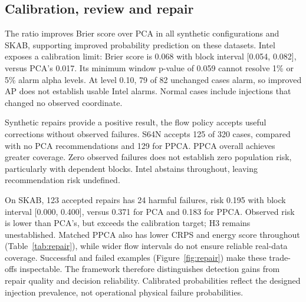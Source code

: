 \documentclass{llncs}
\newcommand{\1}{\mathbf{1}}
\begin{document}
\subsection{Calibration, review and repair}
The ratio improves Brier score over PCA in all synthetic configurations and SKAB, supporting improved probability prediction on these datasets. Intel exposes a calibration limit: Brier score is 0.068 with block interval [0.054, 0.082], versus PCA's 0.017. Its minimum window p-value of 0.059 cannot resolve 1\% or 5\% alarm alpha levels. At level 0.10, 79 of 82 unchanged cases alarm, so improved AP does not establish usable Intel alarms. Normal cases include injections that changed no observed coordinate.

Synthetic repairs provide a positive result, the flow policy accepts useful corrections without observed failures. S64N accepts 125 of 320 cases, compared with no PCA recommendations and 129 for PPCA. PPCA overall achieves greater coverage. Zero observed failures does not establish zero population risk, particularly with dependent blocks. Intel abstains throughout, leaving recommendation risk undefined.

On SKAB, 123 accepted repairs has 24 harmful failures, risk 0.195 with block interval [0.000, 0.400], versus 0.371 for PCA and 0.183 for PPCA. Observed risk is lower than PCA's, but exceeds the calibration target; H3 remains unestablished. Matched PPCA also has lower CRPS and energy score throughout (Table~\ref{tab:repair}), while wider flow intervals do not ensure reliable real-data coverage. Successful and failed examples (Figure~\ref{fig:repair}) make these trade-offs inspectable. The framework therefore distinguishes detection gains from repair quality and decision reliability. Calibrated probabilities reflect the designed injection prevalence, not operational physical failure probabilities.
\end{document}
